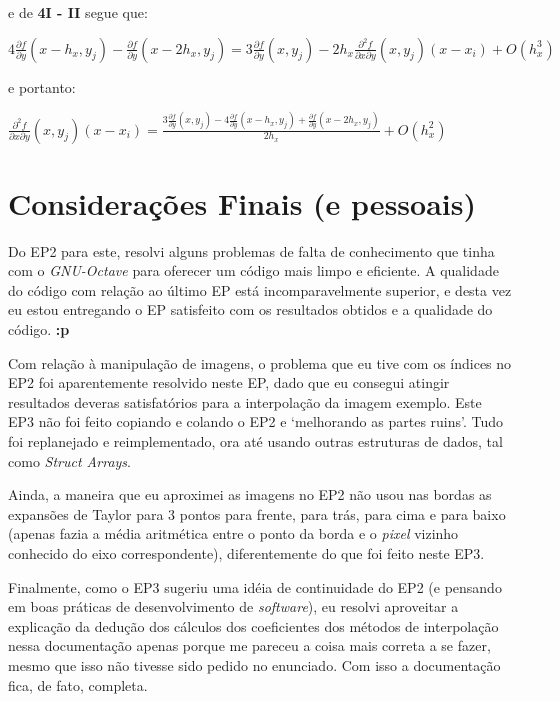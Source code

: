 \documentclass[11pt]{article}
\begin{document}
  e de \textbf{4I - II} segue que:

  $4\frac{\partial f}{\partial y}(x - h_x, y_j) - \frac{\partial f}{\partial y}(x - 2h_x, y_j) = 3\frac{\partial f}{\partial y}(x, y_j) - 2h_x\frac{\partial^2 f}{\partial x \partial y}\left(x, y_j \right)\left(x - x_i \right) + O(h_x^3)$

  e portanto:

  $\frac{\partial^2 f}{\partial x \partial y}\left(x, y_j \right)\left(x - x_i \right) = \frac{3\frac{\partial f}{\partial y}(x, y_j) - 4\frac{\partial f}{\partial y}(x - h_x, y_j) + \frac{\partial f}{\partial y}(x - 2h_x, y_j)}{2h_x}  + O(h_x^2)$


  \section{Considerações Finais (e pessoais)}

  \indent\indent Do EP2 para este, resolvi alguns problemas de falta de conhecimento que tinha com o \textit{GNU-Octave} para oferecer um código mais limpo e eficiente. A qualidade do código
  com relação ao último EP está incomparavelmente superior, e desta vez eu estou entregando o EP satisfeito com os resultados obtidos e a qualidade do código. \textbf{:p}

  Com relação à manipulação de imagens, o problema que eu tive com os índices no EP2 foi aparentemente resolvido neste EP, dado que eu consegui atingir resultados deveras satisfatórios para a interpolação da imagem exemplo.
  Este EP3 não foi feito copiando e colando o EP2 e `melhorando as partes ruins'. Tudo foi replanejado e reimplementado, ora até usando outras estruturas de dados, tal como \textit{Struct Arrays}.

  Ainda, a maneira que eu aproximei as imagens no EP2 não usou nas bordas as expansões de Taylor para 3 pontos para frente, para trás, para cima e para baixo (apenas fazia a média aritmética entre o ponto da borda
  e o \textit{pixel} vizinho conhecido do eixo correspondente), diferentemente do que foi feito neste EP3.

  Finalmente, como o EP3 sugeriu uma idéia de continuidade do EP2 (e pensando em boas práticas de desenvolvimento de \textit{software}), eu resolvi aproveitar a explicação da dedução dos cálculos dos
  coeficientes dos métodos de interpolação nessa documentação apenas porque me pareceu a coisa mais correta a se fazer, mesmo que isso não tivesse sido pedido no enunciado. Com isso a documentação fica, de fato, completa.
\end{document}
